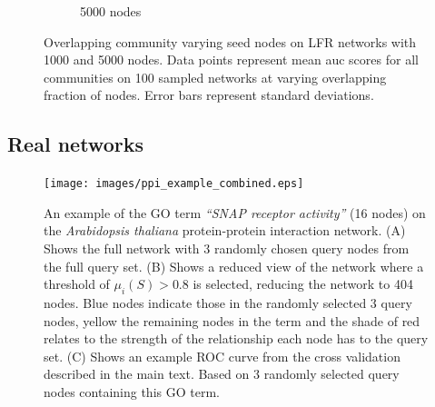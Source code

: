 \documentclass[sigconf]{acmart}
\begin{document}
\begin{figure}[t]
\begin{subfigure}[b]{0.48\textwidth}
        \caption{5000 nodes}
    \end{subfigure}
    \caption{Overlapping community varying seed nodes on LFR networks with 1000 and 5000 nodes.
     Data points represent mean auc scores for all communities on 100 sampled networks at varying overlapping fraction of nodes.
     Error bars represent standard deviations.}
     \label{fig:auc_overlap}
\end{figure}

\subsection{Real networks}
\label{sec:real_networks}
\begin{figure}[t]
\texttt{[image: images/ppi\_example\_combined.eps]}
\caption{An example of the GO term \textit{``SNAP receptor activity''} (16 nodes) on the \textit{Arabidopsis thaliana} protein-protein interaction network.
(A) Shows the full network with 3 randomly chosen query nodes from the full query set.
(B) Shows a reduced view of the network where a threshold of $\mu_i(S) > 0.8$ is selected, reducing the network to 404 nodes.
Blue nodes indicate those in the randomly selected 3 query nodes, yellow the remaining nodes in the term and the shade of red relates to the strength of the relationship each node has to the query set.
(C) Shows an example ROC curve from the cross validation described in the main text. 
Based on 3 randomly selected query nodes containing this GO term.
}
\label{fig:query_example}
\end{figure}
\end{document}
